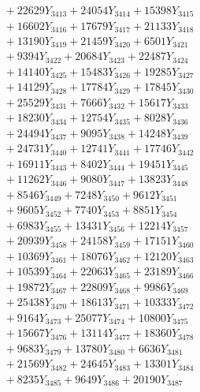 \documentclass[a4paper,10pt]{article}
\begin{document}
{\begin{align}
&\;  + 22629 Y_{3413} + 24054 Y_{3414} + 15398 Y_{3415} \\[0.3ex]
&\;  + 16602 Y_{3416} + 17679 Y_{3417} + 21133 Y_{3418} \\[0.5ex]\allowbreak
&\;  + 13190 Y_{3419} + 21459 Y_{3420} + 6501 Y_{3421} \\[0.3ex]
&\;  + 9394 Y_{3422} + 20684 Y_{3423} + 22487 Y_{3424} \\[0.3ex]
&\;  + 14140 Y_{3425} + 15483 Y_{3426} + 19285 Y_{3427} \\[0.3ex]
&\;  + 14129 Y_{3428} + 17784 Y_{3429} + 17845 Y_{3430} \\[0.3ex]
&\;  + 25529 Y_{3431} + 7666 Y_{3432} + 15617 Y_{3433} \\[0.3ex]
&\;  + 18230 Y_{3434} + 12754 Y_{3435} + 8028 Y_{3436} \\[0.3ex]
&\;  + 24494 Y_{3437} + 9095 Y_{3438} + 14248 Y_{3439} \\[0.3ex]
&\;  + 24731 Y_{3440} + 12741 Y_{3441} + 17746 Y_{3442} \\[0.3ex]
&\;  + 16911 Y_{3443} + 8402 Y_{3444} + 19451 Y_{3445} \\[0.3ex]
&\;  + 11262 Y_{3446} + 9080 Y_{3447} + 13823 Y_{3448} \\[0.5ex]\allowbreak
&\;  + 8546 Y_{3449} + 7248 Y_{3450} + 9612 Y_{3451} \\[0.3ex]
&\;  + 9605 Y_{3452} + 7740 Y_{3453} + 8851 Y_{3454} \\[0.3ex]
&\;  + 6983 Y_{3455} + 13431 Y_{3456} + 12214 Y_{3457} \\[0.3ex]
&\;  + 20939 Y_{3458} + 24158 Y_{3459} + 17151 Y_{3460} \\[0.3ex]
&\;  + 10369 Y_{3461} + 18076 Y_{3462} + 12120 Y_{3463} \\[0.3ex]
&\;  + 10539 Y_{3464} + 22063 Y_{3465} + 23189 Y_{3466} \\[0.3ex]
&\;  + 19872 Y_{3467} + 22809 Y_{3468} + 9986 Y_{3469} \\[0.3ex]
&\;  + 25438 Y_{3470} + 18613 Y_{3471} + 10333 Y_{3472} \\[0.3ex]
&\;  + 9164 Y_{3473} + 25077 Y_{3474} + 10800 Y_{3475} \\[0.3ex]
&\;  + 15667 Y_{3476} + 13114 Y_{3477} + 18360 Y_{3478} \\[0.5ex]\allowbreak
&\;  + 9683 Y_{3479} + 13780 Y_{3480} + 6636 Y_{3481} \\[0.3ex]
&\;  + 21569 Y_{3482} + 24645 Y_{3483} + 13301 Y_{3484} \\[0.3ex]
&\;  + 8235 Y_{3485} + 9649 Y_{3486} + 20190 Y_{3487} \\[0.3ex]

\end{align}}
\end{document}
